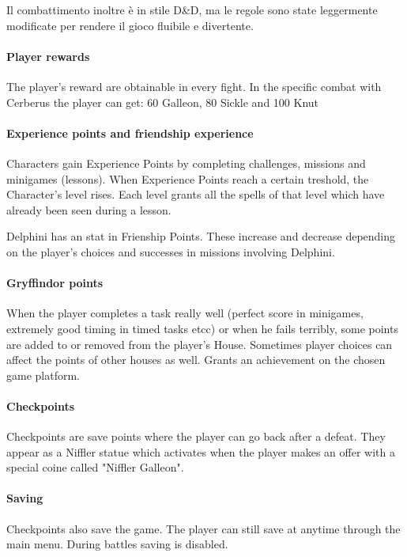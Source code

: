 Il combattimento inoltre è in stile D\&D, ma le regole sono state leggermente modificate per rendere il gioco fluibile e divertente.

\pagebreak

\paragraph{Player rewards}

The player's reward are obtainable in every fight. In the specific combat with Cerberus the player can get: 60 Galleon, 80 Sickle and 100 Knut


\paragraph{ Experience points and friendship experience}

Characters gain Experience Points by completing challenges, missions and minigames (lessons). When Experience Points reach a certain treshold, the Character's level rises. 
Each level grants all the spells of that level which have already been seen during a lesson.

Delphini has an stat in Frienship Points. These increase and decrease depending on the player's choices and successes in missions involving Delphini.


\paragraph{Gryffindor points}

When the player completes a task really well (perfect score in minigames, extremely good timing in timed tasks etcc) or when he fails terribly, some points are added to or removed from the player's House. Sometimes player choices can affect the points of other houses as well.
Grants an achievement on the chosen game platform.

\paragraph{Checkpoints }

Checkpoints are save points where the player can go back after a defeat. They appear as a Niffler statue which activates when the player makes an offer with a special coine called "Niffler Galleon".

\paragraph{Saving}

Checkpoints also save the game. The player can still save at anytime through the main menu. During battles saving is disabled.
\pagebreak